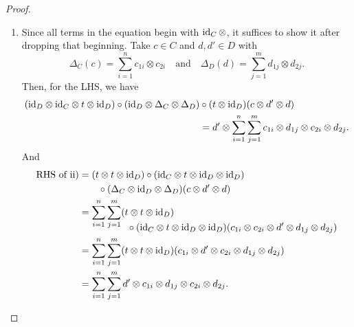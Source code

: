 \begin{proof}
\begin{enumerate}[\rm i)]
    \item Since all terms in the equation begin with $\text{\rm id}_C\,\otimes$, it suffices to show it after dropping that beginning. Take $c\in C$ and $d,d'\in D$ with
    $$
        \Delta_C(c) = \sum_{i=1}^nc_{1i}\otimes c_{2i}
        \quad\text{and}\quad
        \Delta_D(d) = \sum_{j=1}^md_{1j}\otimes d_{2j}.
    $$
    \normalsize
    Then, for the LHS, we have
    \begin{align*}
        (\text{\rm id}_D\otimes\text{\rm id}_C\otimes t\otimes\text{\rm id}_D)
            \circ(\text{\rm id}_D\otimes\Delta_C\otimes\Delta_D)
            &\circ(t\otimes\text{\rm id}_D)(c\otimes d'\otimes d)\\
            &= d'\otimes\sum_{i=1}^n\sum_{j=1}^mc_{1i}\otimes d_{1j}
                \otimes c_{2i}\otimes d_{2j}.
    \end{align*}
    \normalsize
    And
    \begin{align*}
        \text{RHS of ii)} &= (t\otimes t\otimes\text{\rm id}_D)
        \circ(\text{\rm id}_C\otimes t\otimes\text{\rm id}_D\otimes\text{\rm id}_D)\\
        &\qquad\circ(\Delta_C\otimes\text{\rm id}_D\otimes\Delta_D)
            (c\otimes d'\otimes d)\\
        &= \sum_{i=1}^n\sum_{j=1}^m
            (t\otimes t\otimes\text{\rm id}_D)\\[-0.15in]
        &\quad\qquad\qquad\circ(\text{\rm id}_C\otimes t\otimes\text{\rm id}_D\otimes\text{\rm id}_D)
            (c_{1i}\otimes c_{2i}\otimes d'\otimes d_{1j}\otimes d_{2j})\\
        &= \sum_{i=1}^n\sum_{j=1}^m
            (t\otimes t\otimes\text{\rm id}_D)
            (c_{1i}\otimes d'\otimes c_{2i}\otimes d_{1j}\otimes d_{2j})\\
        &= \sum_{i=1}^n\sum_{j=1}^m
            d'\otimes c_{1i}\otimes d_{1j}\otimes c_{2i}\otimes d_{2j}.
    \end{align*}
    \normalsize
    \end{enumerate}
\end{proof}

